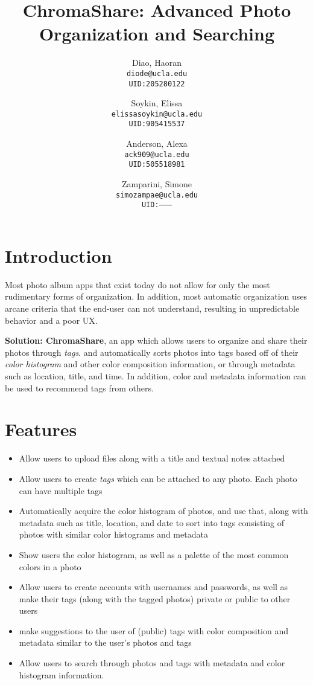 \documentclass{article}
\title{ChromaShare: Advanced Photo Organization and Searching}
\author {
	Diao, Haoran\\ \texttt{diode@ucla.edu}\\ \texttt{UID:205280122}
	\and
	Soykin, Elissa\\ \texttt{elissasoykin@ucla.edu}\\ \texttt{UID:905415537}
	\and
	Anderson, Alexa\\ \texttt{ack909@ucla.edu}\\ \texttt{UID:505518981}
	\and
	Zamparini, Simone\\ \texttt{simozampae@ucla.edu}\\ \texttt{UID:---------}
}
\begin{document}
\maketitle
\section{Introduction}
	Most photo album apps that exist today do not allow for only the most
	rudimentary forms of organization. In addition, most automatic
	organization uses arcane criteria that the end-user can not understand,
	resulting in unpredictable behavior and a poor UX.

	\textbf{Solution: ChromaShare}, an app which allows users to organize
	and share their photos through \textit{tags}. and automatically sorts
	photos into tags based off of their \textit{color histogram} and other color
	composition information, or through metadata such as location, title,
	and time. In addition, color and metadata information can be used to
	recommend tags from others.
\section{Features}

	\begin{itemize}
		\item Allow users to upload files along with a title and textual
		notes attached
		\item Allow users to create \textit{tags} which can be attached
		to any photo. Each photo can have multiple tags
		\item Automatically acquire the color histogram of photos, and
		use that, along with metadata such as title, location, and date
		to sort into tags consisting of photos with similar color
		histograms and metadata
		\item Show users the color histogram, as well as a palette of
		the most common colors in a photo
		\item Allow users to create accounts with usernames and
		passwords, as well as make their tags (along with the tagged
		photos) private or public to other users
		\item make suggestions to the user of (public) tags with color
		composition and metadata similar to the user's photos and tags
		\item Allow users to search through photos and tags with
		metadata and color histogram information.
	\end{itemize}
\end{document}
